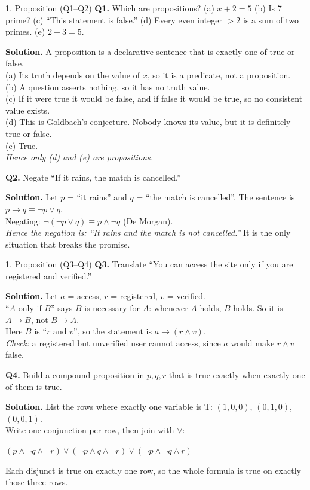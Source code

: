 \documentclass[aspectratio=169,10pt]{beamer}
\newcommand{\qa}[3]{%
  \textbf{Q#1.} #2\par\smallskip
  {\color{ans}\textbf{Solution.} #3}\par\vspace{6pt}}
\begin{document}
\begin{frame}{1. Proposition (Q1--Q2)}
\footnotesize
\qa{1}{Which are propositions? (a) $x+2=5$ (b) Is 7 prime? (c) ``This statement is false.'' (d) Every even integer $>2$ is a sum of two primes. (e) $2+3=5$.}
{A proposition is a declarative sentence that is exactly one of true or false.\\
(a) Its truth depends on the value of $x$, so it is a predicate, not a proposition.\\
(b) A question asserts nothing, so it has no truth value.\\
(c) If it were true it would be false, and if false it would be true, so no consistent value exists.\\
(d) This is Goldbach's conjecture. Nobody knows its value, but it is definitely true or false.\\
(e) True.\\
\emph{Hence only (d) and (e) are propositions.}}
\qa{2}{Negate ``If it rains, the match is cancelled.''}
{Let $p$ = ``it rains'' and $q$ = ``the match is cancelled''. The sentence is $p\to q\equiv\neg p\lor q$.\\
Negating: $\neg(\neg p\lor q)\equiv p\land\neg q$ (De Morgan).\\
\emph{Hence the negation is: ``It rains and the match is not cancelled.''} It is the only situation that breaks the promise.}
\end{frame}

\begin{frame}{1. Proposition (Q3--Q4)}
\footnotesize
\qa{3}{Translate ``You can access the site only if you are registered and verified.''}
{Let $a$ = access, $r$ = registered, $v$ = verified.\\
``$A$ only if $B$'' says $B$ is necessary for $A$: whenever $A$ holds, $B$ holds. So it is $A\to B$, not $B\to A$.\\
Here $B$ is ``$r$ and $v$'', so the statement is $a\to(r\land v)$.\\
\emph{Check:} a registered but unverified user cannot access, since $a$ would make $r\land v$ false.}
\qa{4}{Build a compound proposition in $p,q,r$ that is true exactly when exactly one of them is true.}
{List the rows where exactly one variable is T: $(1,0,0)$, $(0,1,0)$, $(0,0,1)$.\\
Write one conjunction per row, then join with $\lor$:\\
\centerline{$(p\land\neg q\land\neg r)\lor(\neg p\land q\land\neg r)\lor(\neg p\land\neg q\land r)$}
Each disjunct is true on exactly one row, so the whole formula is true on exactly those three rows.}
\end{frame}
\end{document}
